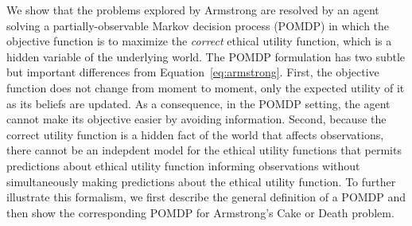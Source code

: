 \documentclass[11pt]{article}
\begin{document}

We show that the problems explored by Armstrong are resolved by an agent solving a partially-observable Markov decision process (POMDP) in which the objective function is to maximize the {\em correct} ethical utility function, which is a hidden variable of the underlying world. The POMDP formulation has two subtle but important differences from Equation~\ref{eq:armstrong}. First, the objective function does not change from moment to moment, only the expected utility of it as its beliefs are updated. As a consequence, in the POMDP setting, the agent cannot make its objective easier by avoiding information. Second, because the correct utility function is a hidden fact of the world that affects observations, there cannot be an indepdent model for the ethical utility functions that permits predictions about ethical utility function informing observations without simultaneously making predictions about the ethical utility function. To further illustrate this formalism, we first describe the general definition of a POMDP and then show the corresponding POMDP for Armstrong's Cake or Death problem.


\end{document}
